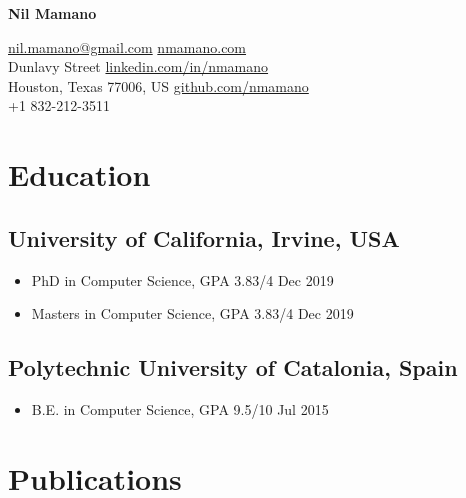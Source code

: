 \documentclass[letterpaper,10pt,oneside]{article}
\begin{document}
\begin{center}
\LARGE{\textbf{Nil Mamano}}\\
\end{center}
\vspace{-2ex}
\hrulefill
\normalsize
\vspace{1em}


\noindent\href{mailto:nil.mamano@gmail.com}{nil.mamano@gmail.com} \hfill \href{http://www.nmamano.com}{nmamano.com} \\
 Dunlavy Street \hfill  \href{https://www.linkedin.com/in/nmamano/}{linkedin.com/in/nmamano} \\
\noindent Houston, Texas 77006, US \hfill   \href{https://github.com/nmamano}{github.com/nmamano} \\
\noindent +1 832-212-3511\hfill 


\section*{Education}
\subsection*{University of California, Irvine, USA}
\begin{itemize}
    \item PhD in Computer Science, GPA 3.83/4 \hfill Dec 2019
    \item Masters in Computer Science, GPA 3.83/4 \hfill Dec 2019
\end{itemize}
\subsection*{Polytechnic University of Catalonia, Spain}
\begin{itemize}
    \item B.E. in Computer Science, GPA 9.5/10 \hfill Jul 2015
\end{itemize}

\section*{Publications}
\end{document}
